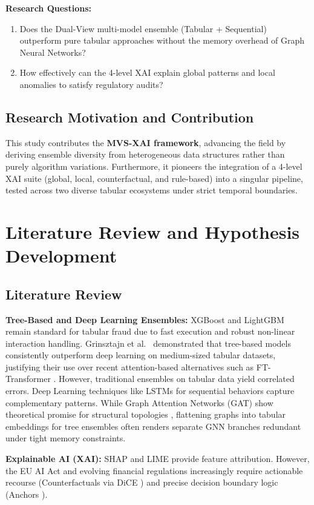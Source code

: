\documentclass[10pt,a4paper,twocolumn]{article}
\begin{document}
\textbf{Research Questions:}
\begin{enumerate}
    \item Does the Dual-View multi-model ensemble (Tabular + Sequential) outperform pure tabular approaches without the memory overhead of Graph Neural Networks?
    \item How effectively can the 4-level XAI explain global patterns and local anomalies to satisfy regulatory audits?
\end{enumerate}

\subsection{Research Motivation and Contribution}
This study contributes the \textbf{MVS-XAI framework}, advancing the field by deriving ensemble diversity from heterogeneous data structures rather than purely algorithm variations. Furthermore, it pioneers the integration of a 4-level XAI suite (global, local, counterfactual, and rule-based) into a singular pipeline, tested across two diverse tabular ecosystems under strict temporal boundaries.

\section{Literature Review and Hypothesis Development}
\subsection{Literature Review}
\textbf{Tree-Based and Deep Learning Ensembles:} XGBoost \cite{chen2016} and LightGBM \cite{ke2017} remain standard for tabular fraud due to fast execution and robust non-linear interaction handling. Grinsztajn et al.~\cite{grinsztajn2022} demonstrated that tree-based models consistently outperform deep learning on medium-sized tabular datasets, justifying their use over recent attention-based alternatives such as FT-Transformer \cite{gorishniy2021}. However, traditional ensembles on tabular data yield correlated errors. Deep Learning techniques like LSTMs for sequential behaviors capture complementary patterns. While Graph Attention Networks (GAT) \cite{velickovic2018} show theoretical promise for structural topologies \cite{liu2021}, flattening graphs into tabular embeddings for tree ensembles often renders separate GNN branches redundant under tight memory constraints.

\textbf{Explainable AI (XAI):} SHAP \cite{lundberg2017} and LIME \cite{ribeiro2016} provide feature attribution. However, the EU AI Act \cite{euaiact2024} and evolving financial regulations increasingly require actionable recourse (Counterfactuals via DiCE \cite{mothilal2020}) and precise decision boundary logic (Anchors \cite{ribeiro2018}).
\end{document}
